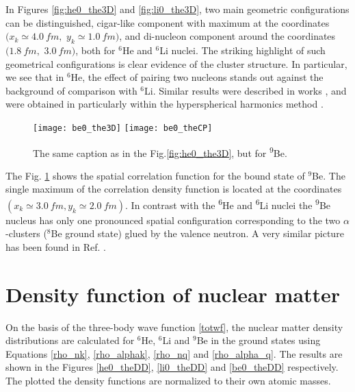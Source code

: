 \documentclass[
12pt, %
oneside, %
english, %
onehalfspacing, %
onehalfspacing, %
headsepline, %
]{MastersDoctoralThesis} %
\newcommand{\he}{\textsuperscript{6}He\xspace}
\newcommand{\li}{\textsuperscript{6}Li\xspace}
\newcommand{\be}{\textsuperscript{9}Be\xspace}
\begin{document}
In Figures \ref{fig:he0_the3D} and \ref{fig:li0_the3D}, two main geometric configurations can be distinguished, cigar-like component with maximum at the coordinates $(x_k \simeq 4.0~ fm,$ $y_k \simeq 1.0~ fm)$, and di-nucleon component around the coordinates $(1.8~ fm,$ $3.0~ fm)$, both for $^6$He and  $^6$Li nuclei. 
The striking highlight of such geometrical configurations is clear evidence of the cluster structure. 
In particular, we see that in $^6$He, the effect of pairing two nucleons stands out against the background of comparison with $^6$Li. 
Similar results were described in works \cite{kukulin1977stochastic, papadimitriou2011charge}, and were obtained in particularly within the hyperspherical harmonics method \cite{zhukov1993bound}. 

\begin{figure}[tp]
\centering
\texttt{[image: be0\_the3D]}
\texttt{[image: be0\_theCP]}
\decoRule
\caption{ \footnotesize The same caption as in the Fig.\ref{fig:he0_the3D}, but for \be.}
\label{fig:be0_the3D}
\end{figure} 


The Fig. \ref{fig:be0_the3D} shows the spatial correlation function for the bound state of $^9$Be. 
The single maximum of the correlation density function is located at the coordinates $(x_k \simeq 3.0 ~fm, y_k \simeq 2.0~ fm)$. 
In contrast with the \he and \li nuclei the \be nucleus has only one pronounced spatial configuration corresponding to the two $\alpha$-clusters ($^8$Be ground state) glued by the valence neutron. A very similar picture has been found in Ref. \cite{hussein2015low}. 

\section{Density function of nuclear matter}
On the basis of the three-body wave function \ref{totwf}, the nuclear matter density distributions are calculated for $^6$He, $^6$Li and $^9$Be in the ground states using Equations \ref{rho_nk}, \ref{rho_alphak}, \ref{rho_nq} and \ref{rho_alpha_q}. The results are shown in the Figures \ref{he0_theDD}, \ref{li0_theDD} and \ref{be0_theDD} respectively.
The plotted the density functions are normalized to their own atomic masses. 
\end{document}
